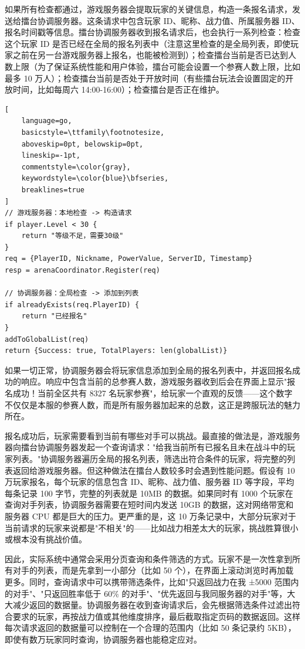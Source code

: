 如果所有检查都通过，游戏服务器会提取玩家的关键信息，构造一条报名请求，发送给擂台协调服务器。这条请求中包含玩家 ID、昵称、战力值、所属服务器 ID、报名时间戳等信息。擂台协调服务器收到报名请求后，也会执行一系列检查：检查这个玩家 ID 是否已经在全局的报名列表中（注意这里检查的是全局列表，即使玩家之前在另一台游戏服务器上报名，也能被检测到）；检查擂台当前是否已达到人数上限（为了保证系统性能和用户体验，擂台可能会设置一个参赛人数上限，比如最多 10 万人）；检查擂台当前是否处于开放时间（有些擂台玩法会设置固定的开放时间，比如每周六 14:00-16:00）；检查擂台是否正在维护。

\begin{tcolorbox}[title=报名请求的处理流程]
\begin{lstlisting}[
    language=go,
    basicstyle=\ttfamily\footnotesize,
    aboveskip=0pt, belowskip=0pt,
    lineskip=-1pt,
    commentstyle=\color{gray},
    keywordstyle=\color{blue}\bfseries,
    breaklines=true
]
// 游戏服务器：本地检查 -> 构造请求
if player.Level < 30 {
    return "等级不足，需要30级"
}
req = {PlayerID, Nickname, PowerValue, ServerID, Timestamp}
resp = arenaCoordinator.Register(req)

// 协调服务器：全局检查 -> 添加到列表
if alreadyExists(req.PlayerID) {
    return "已经报名"
}
addToGlobalList(req)
return {Success: true, TotalPlayers: len(globalList)}
\end{lstlisting}
\end{tcolorbox}

如果一切正常，协调服务器会将玩家信息添加到全局的报名列表中，并返回报名成功的响应。响应中包含当前的总参赛人数，游戏服务器收到后会在界面上显示"报名成功！当前全区共有 8327 名玩家参赛"，给玩家一个直观的反馈——这个数字不仅仅是本服的参赛人数，而是所有服务器加起来的总数，这正是跨服玩法的魅力所在。

报名成功后，玩家需要看到当前有哪些对手可以挑战。最直接的做法是，游戏服务器向擂台协调服务器发起一个查询请求："给我当前所有已报名且未在战斗中的玩家列表。"协调服务器遍历全局的报名列表，筛选出符合条件的玩家，将完整的列表返回给游戏服务器。但这种做法在擂台人数较多时会遇到性能问题。假设有 10 万玩家报名，每个玩家的信息包含 ID、昵称、战力值、服务器 ID 等字段，平均每条记录 100 字节，完整的列表就是 10MB 的数据。如果同时有 1000 个玩家在查询对手列表，协调服务器需要在短时间内发送 10GB 的数据，这对网络带宽和服务器 CPU 都是巨大的压力。更严重的是，这 10 万条记录中，大部分玩家对于当前请求的玩家来说都是"不相关"的——比如战力相差太大的玩家，挑战胜算很小或根本没有挑战价值。

因此，实际系统中通常会采用分页查询和条件筛选的方式。玩家不是一次性拿到所有对手的列表，而是先拿到一小部分（比如 50 个），在界面上滚动浏览时再加载更多。同时，查询请求中可以携带筛选条件，比如"只返回战力在我 ±5000 范围内的对手"、"只返回胜率低于 60\% 的对手"、"优先返回与我同服务器的对手"等，大大减少返回的数据量。协调服务器在收到查询请求后，会先根据筛选条件过滤出符合要求的玩家，再按战力值或其他维度排序，最后截取指定页码的数据返回。这样每次请求返回的数据量可以控制在一个合理的范围内（比如 50 条记录约 5KB），即使有数万玩家同时查询，协调服务器也能稳定应对。


